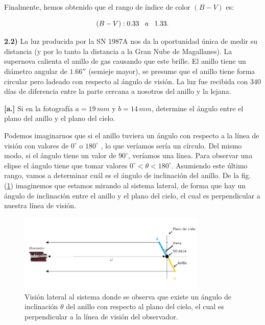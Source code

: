 \documentclass[paper=a4, fontsize=10pt]{scrartcl} %
\begin{document}
Finalmente, hemos obtenido que el rango de índice de color $(B-V)$ es:

$$(B-V): 0.33 \hspace{0.3cm} a \hspace{0.3cm} 1.33.$$

\vspace{0.5cm} 

{\bf{2.2)}} La luz producida por la SN 1987A nos da la oportunidad única de medir su distancia (y por lo tanto la distancia a la Gran Nube de Magallanes). La supernova calienta el anillo de gas causando que este brille. El anillo tiene un diámetro angular de $1.66''$ (semieje mayor), se presume que el anillo tiene forma circular pero ladeado con respecto al ángulo de visión. La luz fue recibida con $340$ días de diferencia entre la parte cercana a nosotros del anillo y la lejana.

\vspace{0.3cm}

{\bf{[a.]}} Si en la fotografía $a = 19 \, mm$ y $b = 14 \, mm$, determine el ángulo entre el plano del anillo y el plano del cielo. 

\vspace{0.3cm}

Podemos imaginarnos que si el anillo tuviera un ángulo con respecto a la línea de visión con valores de $0^{\circ}$ o $180^{\circ}$ , lo que veríamos sería un círculo. Del mismo modo, si el ángulo tiene un valor de $90^{\circ}$, veríamos una línea. Para observar una elipse el ángulo tiene que tomar valores $0^{\circ}<\theta < 180^{\circ}$. Asumiendo este último rango, vamos a determinar cuál es el ángulo de inclinación del anillo. De la fig. (\ref{fig:2.1}) imaginemos que estamos mirando al sistema lateral, de forma que hay un ángulo de inclinación entre el anillo y el plano del cielo, el cual es perpendicular a nuestra línea de visión. 

\begin{figure}[h]
\begin{center}
\includegraphics[width=0.8\textwidth]{fig_5_SN}
\caption{\small{Visión lateral al sistema donde se observa que existe un ángulo de inclinación $\theta$ del anillo con respecto al plano del cielo, el cual es perpendicular a la línea de visión del observador.}}
\label{fig:2.1} 
\end{center}
\end{figure}
\end{document}
